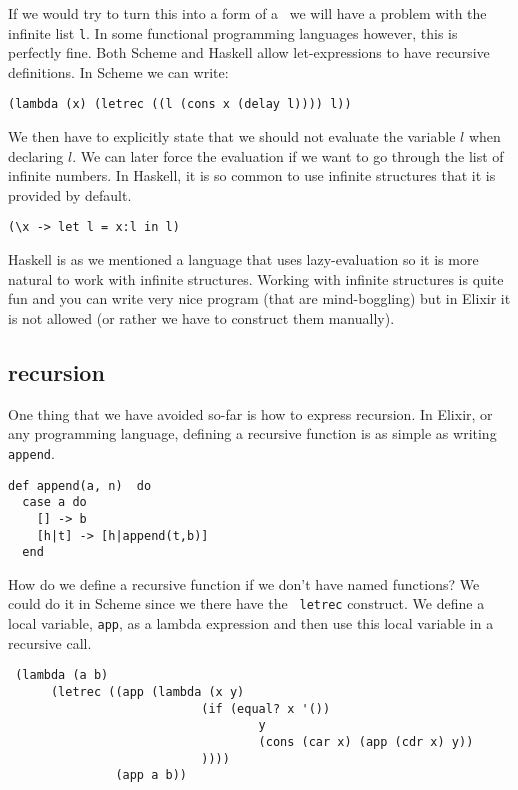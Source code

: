 \documentclass[a4paper,11pt]{article}
\begin{document}
If we would try to turn this into a form of a \lame\ we will have a
problem with the infinite list {\tt l}. In some functional
programming languages however, this is perfectly fine. Both Scheme and
Haskell allow let-expressions to have recursive definitions. In Scheme
we can write:

\begin{center}{\tt  (lambda (x) (letrec ((l (cons x (delay l)))) l))}
\end{center}

We then have to explicitly state that we should not evaluate the
variable $l$ when declaring $l$. We can later force the evaluation if
we want to go through the list of infinite numbers. In Haskell, it is
so common to use infinite structures that it is provided by default. 

\begin{center}{\tt  (\textbackslash x  -> let  l = x:l  in  l)}
\end{center}

Haskell is as we mentioned a language that uses lazy-evaluation so it
is more natural to work with infinite structures. Working with
infinite structures is quite fun and you can write very nice program
(that are mind-boggling) but in Elixir it is not allowed (or rather we
have to construct them manually).

\subsection{recursion}

One thing that we have avoided so-far is how to express recursion. In
Elixir, or any programming language, defining a recursive function is
as simple as writing {\tt append}.

\begin{verbatim}
def append(a, n)  do
  case a do
    [] -> b
    [h|t] -> [h|append(t,b)]
  end    
\end{verbatim}

How do we define a recursive function if we don't have named
functions? We could do it in Scheme since we there have the {\tt
  letrec} construct. We define a local variable, {\tt app}, as a
lambda expression and then use this local variable in a recursive
call.

\vspace{10pt}

\begin{verbatim}
 (lambda (a b) 
      (letrec ((app (lambda (x y) 
                           (if (equal? x '()) 
                                   y 
                                   (cons (car x) (app (cdr x) y))
                           )))) 
               (app a b))
\end{verbatim}
\vspace{10pt}
\end{document}
